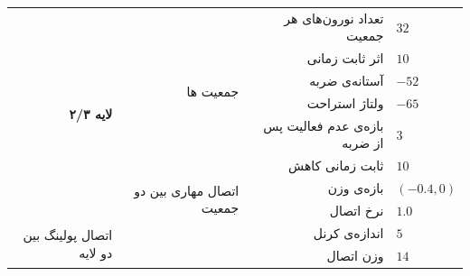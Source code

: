 \documentclass[12pt]{report}
\begin{document}
\begin{table}[p]
{\begin{tabular}{|rrrl|}
		\multicolumn{1}{|r|}{\multirow{8}{*}{\textbf{لایه ۲/۳}}}        & \multicolumn{1}{r|}{\multirow{6}{*}{جمعیت ها}}                 & \multicolumn{1}{r|}{تعداد نورون‌های هر جمعیت}             & $32$ \\ \cline{3-4} 
		\multicolumn{1}{|r|}{}                                          & \multicolumn{1}{r|}{}                                          & \multicolumn{1}{r|}{اثر ثابت زمانی} & $10$                      \\ \cline{3-4} 
		\multicolumn{1}{|r|}{}                                          & \multicolumn{1}{r|}{}                                          & \multicolumn{1}{r|}{آستانه‌ی ضربه}                        & $-52$                     \\ \cline{3-4} 
		\multicolumn{1}{|r|}{}                                          & \multicolumn{1}{r|}{}                                          & \multicolumn{1}{r|}{ولتاژ استراحت}                        & $-65$                     \\ \cline{3-4} 
		\multicolumn{1}{|r|}{}                                          & \multicolumn{1}{r|}{}                                          & \multicolumn{1}{r|}{بازه‌ی عدم فعالیت پس از ضربه}         & $3$                       \\ \cline{3-4} 
		\multicolumn{1}{|r|}{}                                          & \multicolumn{1}{r|}{}                                          & \multicolumn{1}{r|}{ثابت زمانی کاهش}                      & $10$                      \\ \cline{2-4} 
		\multicolumn{1}{|r|}{}                                          & \multicolumn{1}{r|}{\multirow{2}{*}{اتصال مهاری بین دو جمعیت}} & \multicolumn{1}{r|}{بازه‌ی وزن}                           & $(-0.4,0)$                \\ \cline{3-4} 
		\multicolumn{1}{|r|}{}                                          & \multicolumn{1}{r|}{}                                          & \multicolumn{1}{r|}{نرخ اتصال}                            & $1.0$                     \\ \hline
		\multicolumn{1}{|r|}{\multirow{3}{*}{اتصال پولینگ بین دو لایه}} & \multicolumn{2}{r|}{اندازه‌ی کرنل}                                                                                         & $5$                       \\ \cline{2-4} 
		\multicolumn{1}{|r|}{}                                          & \multicolumn{2}{r|}{وزن اتصال}                                                                                             & $14$                      \\ \cline{2-4} 

\end{tabular}}
\end{table}
\end{document}
